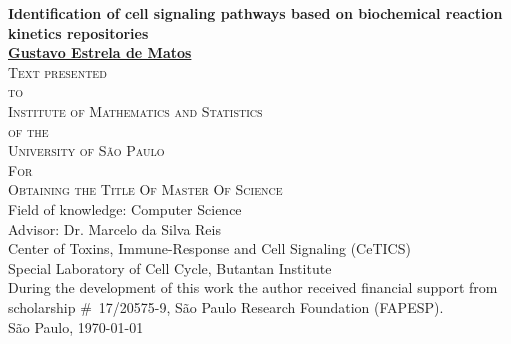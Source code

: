 \documentclass[12pt, twoside, bibliography=totoc]{report}
\numberwithin{mydefinition}{section}
\numberwithin{mytheorem}{section}
\numberwithin{mylemma}{section}
\numberwithin{corollary}{section}
\begin{document}

\thispagestyle{empty}
\begin{center}
{\Large
{\bf Identification of cell signaling pathways based on biochemical 
    reaction kinetics repositories}\\
\bigskip
\bigskip
\bigskip
\bigskip
    {\bf \href{mailto:gustavo.estrela.matos@gmail.com}{Gustavo Estrela de Matos}}\\
\bigskip
\bigskip
\bigskip
\bigskip
\textsc{
    Text presented\\[-0.25cm] 
    to\\[-0.25cm]
    Institute of Mathematics and Statistics\\[-0.25cm]
    of the\\[-0.25cm]
    University of São Paulo\\[-0.25cm]
    For\\[-0.25cm]
    Obtaining the Title Of Master Of Science\\
    }
\bigskip
\bigskip
\bigskip
\bigskip
Field of knowledge: Computer Science\\
\bigskip
Advisor: Dr. Marcelo da Silva Reis\\
\bigskip
\bigskip
\bigskip
\bigskip
\bigskip
\bigskip
\bigskip
\bigskip
Center of Toxins, Immune-Response and Cell Signaling (CeTICS)\\
\bigskip
Special Laboratory of Cell Cycle, Butantan Institute\\
\bigskip
\bigskip
{\normalsize During the development of this work the author received 
    financial support from scholarship \#~17/20575-9, São Paulo Research Foundation (FAPESP).}\\
\bigskip
\bigskip
\bigskip
São Paulo, \today
}
\end{center}
\newpage
\end{document}

